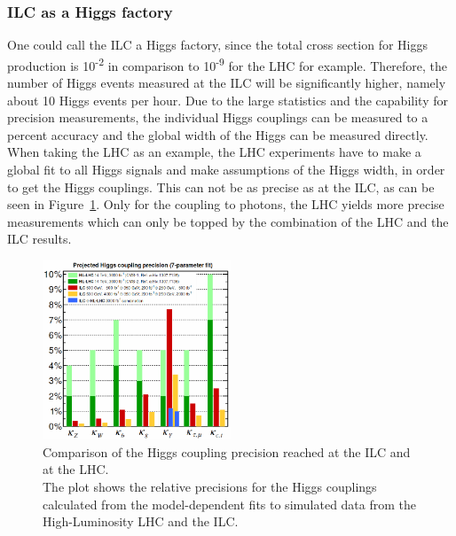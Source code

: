\subsubsection{ILC as a Higgs factory}
One could call the ILC a Higgs factory, since the total cross section for Higgs production is 10\textsuperscript{-2} in comparison to 10\textsuperscript{-9} for the LHC for example.
Therefore, the number of Higgs events measured at the ILC will be significantly higher, namely about 10 Higgs events per hour.
Due to the large statistics and the capability for precision measurements, the individual Higgs couplings can be measured to a percent accuracy and the global width of the Higgs can be measured directly.
When taking the LHC as an example, the LHC experiments have to make a global fit to all Higgs signals and make assumptions of the Higgs width, in order to get the Higgs couplings.
This can not be as precise as at the ILC, as can be seen in Figure~\ref{fig:Higgs_couplings}.
Only for the coupling to photons, the LHC yields more precise measurements which can only be topped by the combination of the LHC and the ILC results.

\begin{figure}
\centering
\includegraphics[width=0.5\textwidth]{Figures/Higgs_couplings.png}
\caption[Higgs coupling precisions]{Comparison of the Higgs coupling precision reached at the ILC and at the LHC.\cite[p. 9]{ILCPhysics}\\
The plot shows the relative precisions for the Higgs couplings calculated from the model-dependent fits to simulated data from the High-Luminosity LHC and the ILC.}
\label{fig:Higgs_couplings}
\end{figure}

